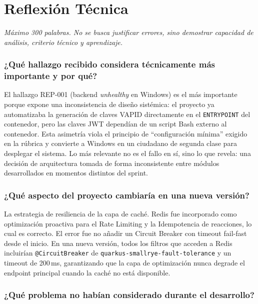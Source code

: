 \documentclass[10pt,a4paper]{article}
\newcommand{\code}[1]{\nolinkurl{#1}}
\begin{document}
\section{Reflexión Técnica}
\begin{tcolorbox}[colback=blue!3,colframe=blueteamcolor!40,arc=2mm]
\small\textit{Máximo 300 palabras. No se busca justificar errores, sino demostrar capacidad de análisis, criterio técnico y aprendizaje.}
\end{tcolorbox}

\subsubsection*{¿Qué hallazgo recibido considera técnicamente más importante y por qué?}

El hallazgo REP-001 (backend \textit{unhealthy} en Windows) es el más importante porque expone una inconsistencia de diseño sistémica: el proyecto ya automatizaba la generación de claves VAPID directamente en el \code{ENTRYPOINT} del contenedor, pero las claves JWT dependían de un script Bash externo al contenedor. Esta asimetría viola el principio de ``configuración mínima'' exigido en la rúbrica y convierte a Windows en un ciudadano de segunda clase para desplegar el sistema. Lo más relevante no es el fallo en sí, sino lo que revela: una decisión de arquitectura tomada de forma inconsistente entre módulos desarrollados en momentos distintos del sprint.

\subsubsection*{¿Qué aspecto del proyecto cambiaría en una nueva versión?}

La estrategia de resiliencia de la capa de caché. Redis fue incorporado como optimización proactiva para el Rate Limiting y la Idempotencia de reacciones, lo cual es correcto. El error fue no añadir un Circuit Breaker con timeout fail-fast desde el inicio. En una nueva versión, todos los filtros que acceden a Redis incluirían \code{@CircuitBreaker} de \code{quarkus-smallrye-fault-tolerance} y un timeout de 200\,ms, garantizando que la capa de optimización nunca degrade el endpoint principal cuando la caché no está disponible.

\subsubsection*{¿Qué problema no habían considerado durante el desarrollo?}
\end{document}
